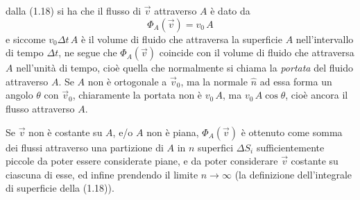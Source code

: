dalla (1.18) si ha che il flusso di $\vec v$ attraverso $A$ \`e dato da
\begin{equation}
  \Phi_A(\vec v)=v_0\,A
  \tag{1.19}
\end{equation}
e siccome $v_0\Delta t\,A$ \`e il volume di fluido che attraversa la superficie
$A$ nell'intervallo di tempo $\Delta t$, ne segue che $\Phi_A(\vec v)$ coincide
con il volume di fluido che attraversa $A$ nell'unit\`a di tempo, cio\`e quella
che normalmente si chiama la \emph{portata} del fluido attraverso $A$. Se $A$
non \`e ortogonale a $\vec v_0$, ma la normale $\hat n$ ad essa forma un angolo
$\theta$ con $\vec v_0$, chiaramente la portata non \`e $v_0\,A$, ma
$v_0\,A\cos\theta$, cio\`e ancora il flusso attraverso $A$.

Se $\vec v$ non \`e costante su $A$, e/o $A$ non \`e piana, $\Phi_A(\vec v)$ \`e
ottenuto come somma dei flussi attraverso una partizione di $A$ in $n$ superfici
$\Delta S_i$ sufficientemente piccole da poter essere considerate piane, e da
poter considerare $\vec v$ costante su ciascuna di esse, ed infine prendendo il
limite $n\to\infty$ \big(la definizione dell'integrale di superficie della
(1.18)\big).

